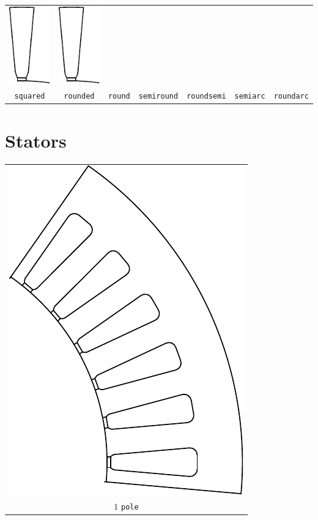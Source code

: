 \documentclass[a4paper,11pt,oneside,fleqn,titlepage]{report}
\begin{document}
{\begin{tabular}{ccccccc}
\includegraphics{../examples/slots/semiarc_slot} &
\includegraphics{../examples/slots/roundarc_slot} \\
%
\texttt{squared} &
\texttt{rounded} &
\texttt{round} &
\texttt{semiround} &
\texttt{roundsemi} &
\texttt{semiarc} & 
\texttt{roundarc}
\end{tabular}}
\vspace{1cm}


\newpage
\section{Stators}
\begin{tabular}{c}
\includegraphics[scale=0.75]{../examples/stators/1pole} 
\\
$ 1 $ \texttt{pole}
\end{tabular}
\vspace{5mm}
\end{document}
